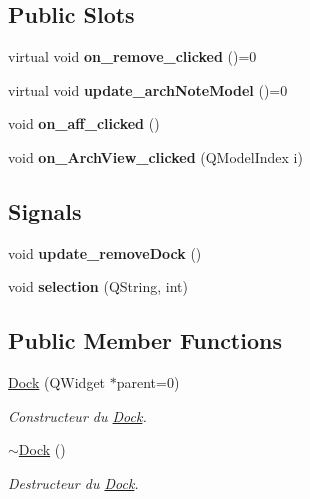 \subsection*{Public Slots}
\begin{DoxyCompactItemize}
\item 
\mbox{\label{class_dock_a74bd1a9145a04fe37c1c97bedd7c460d}} 
virtual void {\bfseries on\+\_\+remove\+\_\+clicked} ()=0
\item 
\mbox{\label{class_dock_aba7e136be0e7bbff8cf76369e10982c0}} 
virtual void {\bfseries update\+\_\+arch\+Note\+Model} ()=0
\item 
\mbox{\label{class_dock_a162f55159baba3ad2f485c1cbfb67fe2}} 
void {\bfseries on\+\_\+aff\+\_\+clicked} ()
\item 
\mbox{\label{class_dock_a88d9948db78eddd5551bb47e4cb63277}} 
void {\bfseries on\+\_\+\+Arch\+View\+\_\+clicked} (Q\+Model\+Index i)
\end{DoxyCompactItemize}
\subsection*{Signals}
\begin{DoxyCompactItemize}
\item 
\mbox{\label{class_dock_aca603632e4561e582254273c234d97a8}} 
void {\bfseries update\+\_\+remove\+Dock} ()
\item 
\mbox{\label{class_dock_a8abd37c4496e6c548ecb4ecb685679a1}} 
void {\bfseries selection} (Q\+String, int)
\end{DoxyCompactItemize}
\subsection*{Public Member Functions}
\begin{DoxyCompactItemize}
\item 
\hyperlink{class_dock_a1e81e2926e94969514ac45a9d839731c}{Dock} (Q\+Widget $\ast$parent=0)
\begin{DoxyCompactList}\small\item\em Constructeur du \hyperlink{class_dock}{Dock}. \end{DoxyCompactList}\item 
\mbox{\label{class_dock_a4876718542e50eba0c950128e0bc2663}} 
\hyperlink{class_dock_a4876718542e50eba0c950128e0bc2663}{$\sim$\+Dock} ()
\begin{DoxyCompactList}\small\item\em Destructeur du \hyperlink{class_dock}{Dock}. \end{DoxyCompactList}\end{DoxyCompactItemize}
